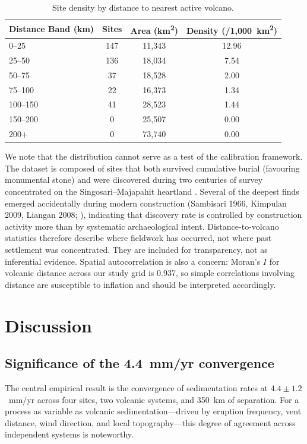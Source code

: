 \documentclass[12pt,a4paper]{article}
\begin{document}
\begin{table}[t]
\caption{Site density by distance to nearest active volcano.}
\label{tab:density}
\begin{tabular}{lccc}
\toprule
Distance Band (km) & Sites & Area (km\textsuperscript{2}) & Density (/1,000~km\textsuperscript{2}) \\
\midrule
0--25 & 147 & 11,343 & 12.96 \\
25--50 & 136 & 18,034 & 7.54 \\
50--75 & 37 & 18,528 & 2.00 \\
75--100 & 22 & 16,373 & 1.34 \\
100--150 & 41 & 28,523 & 1.44 \\
150--200 & 0 & 25,507 & 0.00 \\
200+ & 0 & 73,740 & 0.00 \\
\bottomrule
\end{tabular}
\end{table}

We note that the distribution cannot serve as a test of the calibration framework. The dataset is composed of sites that both survived cumulative burial (favouring monumental stone) and were discovered during two centuries of survey concentrated on the Singosari--Majapahit heartland \citep{kinney2003}. Several of the deepest finds emerged accidentally during modern construction (Sambisari 1966, Kimpulan 2009, Liangan 2008; \citealp{putra2019,abbas2016}), indicating that discovery rate is controlled by construction activity more than by systematic archaeological intent. Distance-to-volcano statistics therefore describe where fieldwork has occurred, not where past settlement was concentrated. They are included for transparency, not as inferential evidence. Spatial autocorrelation is also a concern: Moran's $I$ for volcanic distance across our study grid is 0.937, so simple correlations involving distance are susceptible to inflation and should be interpreted accordingly.


\section{Discussion}

\subsection{Significance of the 4.4~mm/yr convergence}

The central empirical result is the convergence of sedimentation rates at $4.4 \pm 1.2$~mm/yr across four sites, two volcanic systems, and 350~km of separation. For a process as variable as volcanic sedimentation---driven by eruption frequency, vent distance, wind direction, and local topography---this degree of agreement across independent systems is noteworthy.
\end{document}
